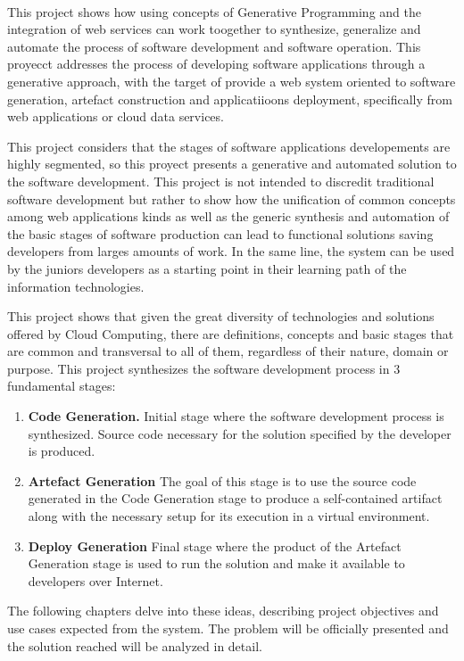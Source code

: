 
\vspace{0.7cm}
\\


This project shows how using concepts of  Generative Programming and the integration of web services can work toogether to synthesize, generalize and automate the process of  software development and software operation. This proyecct  addresses the process of developing software applications through a generative approach, with the target of provide a web system oriented to software generation, artefact construction and applicatiioons deployment, specifically from web applications or cloud data services.

 
This project considers that the stages of software applications developements are highly segmented, so this proyect presents a generative and automated solution to the software development. This project is not intended to discredit traditional software development but rather to show how the unification of common concepts among web applications kinds as well as the generic synthesis and automation of the basic stages of software production can lead to functional solutions saving developers from larges amounts of work. In the same line, the system can be used by the juniors developers as a starting point in their learning path of the information technologies.
 
 
This project shows that given the great diversity of technologies and solutions offered by Cloud Computing, there are definitions, concepts and basic stages that are common and transversal to all of them, regardless of their nature, domain or purpose. This project synthesizes the software development process in 3 fundamental stages:

\begin{enumerate}
\item \textbf{ Code Generation. }  Initial stage where the software development process is synthesized. Source code necessary for the solution specified by the developer is produced.

\item \textbf{ Artefact Generation }  The goal of this stage is to use the source code generated in the Code Generation stage to produce a self-contained artifact along with the necessary setup for its execution in a virtual environment.

\item \textbf{ Deploy Generation } Final stage where the product of the Artefact Generation stage is used to run the solution and make it available to developers over Internet.
\end{enumerate}
 

The following chapters delve into these ideas, describing project objectives and use cases expected from the system. The problem will be officially presented and the solution reached will be analyzed in detail.
